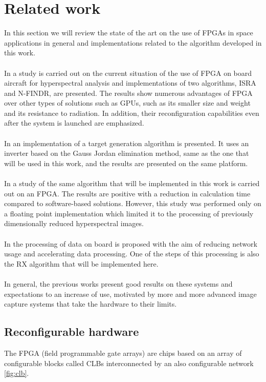 \section{Related work}
In this section we will review the state of the art on the use of FPGAs in space applications in general and implementations related to the algorithm developed in this work.
\\
\\
In \cite{lopez_promise_2013} a study is carried out on the current situation of the use of FPGA on board aircraft for hyperspectral analysis and implementations of two algorithms, ISRA and N-FINDR, are presented. The results show numerous advantages of FPGA over other types of solutions such as GPUs, such as its smaller size and weight and its resistance to radiation. In addition, their reconfiguration capabilities even after the system is launched are emphasized.
\\
\\
In \cite{gonzalez_fpga_2016} an implementation of a target generation algorithm is presented. It uses an inverter based on the Gauss Jordan elimination method, same as the one that will be used in this work, and the results are presented on the same platform.
\\
\\
In \cite{colome_garcia_implementacion_2013} a study of the same algorithm that will be implemented in this work is carried out on an FPGA. The results are positive with a reduction in calculation time compared to software-based solutions. However, this study was performed only on a floating point implementation which limited it to the processing of previously dimensionally reduced hyperspectral images.
\\
\\
In \cite{theiler_onboard_2018} the processing of data on board is proposed with the aim of reducing network usage and accelerating data processing. One of the steps of this processing is also the RX algorithm that will be implemented here.
\\
\\
In general, the previous works present good results on these systems and expectations to an increase of use, motivated by more and more advanced image capture systems that take the hardware to their limits.

\subsection{Reconfigurable hardware}
The FPGA (field programmable gate arrays) are chips based on an array of configurable blocks called CLBs interconnected by an also configurable network \ref{fig:clb}.

